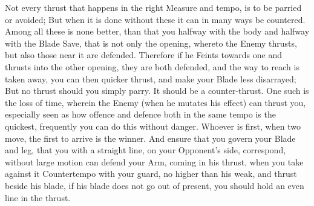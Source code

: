 Not every thrust that happens in the right Measure and tempo, is to be
parried or avoided; But when it is done without these it can in many
ways be countered. Among all these is none better, than that you
halfway with the body and halfway with the Blade Save, that is not
only the opening, whereto the Enemy thrusts, but also those near it
are defended. Therefore if he Feints towards one and thrusts into the
other opening, they are both defended, and the way to reach is taken
away, you can then quicker thrust, and make your Blade less
disarrayed; But no thrust should you simply parry. It should be a
counter-thrust.
One such is the loss of time, wherein the Enemy (when he mutates
his effect) can thrust you, especially seen as how offence and defence both in
the same tempo is the quickest, frequently you can do this without
danger. Whoever is first, when two move, the first to arrive is the winner.
And ensure that you govern your Blade and leg, that you with
a straight line, on your Opponent's side, correspond, without large motion
can defend your Arm, coming in his thrust, when you take against it
Countertempo with your guard, no higher than his weak, and thrust
beside his blade, if his blade does not go out of present, you should
hold an even line in the thrust.

